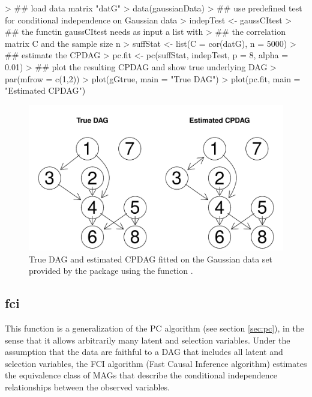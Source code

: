 \documentclass[article]{jss}
\begin{document}
\begin{Schunk}
\begin{Sinput}
> ## load data matrix "datG"
> data(gaussianData)
> ## use predefined test for conditional independence on Gaussian data
> indepTest <- gaussCItest 
> ## the functin gaussCItest needs as input a list with
> ## the correlation matrix C and the sample size n
> suffStat <- list(C = cor(datG), n = 5000)
> ## estimate the CPDAG
> pc.fit <- pc(suffStat, indepTest, p = 8, alpha = 0.01)
> ## plot the resulting CPDAG and show true underlying DAG
> par(mfrow = c(1,2))
> plot(gGtrue, main = "True DAG")
> plot(pc.fit, main = "Estimated CPDAG")
\end{Sinput}
\end{Schunk}
\begin{figure}
  \begin{center}
\includegraphics{pcalgDoc-011}
\caption{True DAG and estimated CPDAG fitted on the Gaussian data set provided by the
  package using the function .}
\label{fig:pcFit1}
\end{center}
\end{figure}

\subsection{fci}\label{sec:fci}

This function is a generalization of the PC algorithm (see section
\ref{sec:pc}), in the sense that it allows arbitrarily many latent and
selection variables. Under the assumption that the data are faithful to a
DAG that includes all latent and selection variables, the FCI algorithm
(Fast Causal Inference algorithm) estimates the equivalence class of MAGs
that describe the conditional independence relationships between the
observed variables.
\end{document}
